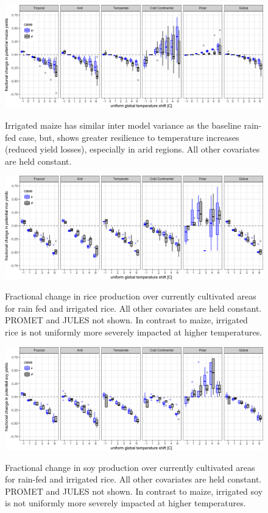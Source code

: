 \documentclass[10pt]{article}
\begin{document}
\begin{figure}[h!]
\includegraphics[width=\textwidth]{s_sim_KG_irr_all.png}\\
\caption{Irrigated maize has similar inter model variance as the baseline rain-fed case, but, shows greater resilience to temperature increases (reduced yield losses), especially in arid regions. All other covariates are held constant.}
\label{fig:KGirr_all}
\end{figure}

\begin{figure}[h!]
\includegraphics[width=\textwidth]{s_rice_sim_CG_area_weight.png}\\
\caption{Fractional change in rice production over currently cultivated areas for rain fed and irrigated rice. All other covariates are held constant. PROMET and JULES not shown. In contrast to maize, irrigated rice is not uniformly more severely impacted at higher temperatures.}
\label{fig:rice_currentcult}
\end{figure}

\begin{figure}[h!]
\includegraphics[width=\textwidth]{s_soy_sim_CG_area_weight.png}\\
\caption{Fractional change in soy production over currently cultivated areas for rain-fed and irrigated rice. All other covariates are held constant. PROMET and JULES not shown. In contrast to maize, irrigated soy is not uniformly more severely impacted at higher temperatures.}
\label{fig:soy_currentcult}
\end{figure}
\end{document}

